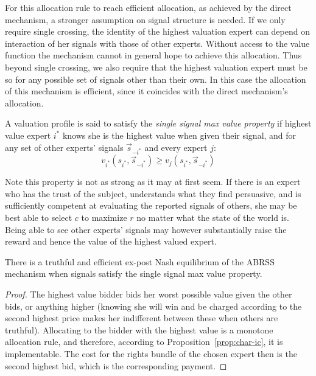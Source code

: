 For this allocation rule to reach efficient allocation, as achieved by the direct mechanism, a stronger assumption on signal structure is needed. If we only require single crossing, the identity of the highest valuation expert can depend on interaction of her signals with those of other experts. Without access to the value function the mechanism cannot in general hope to achieve this allocation.
Thus beyond single crossing, we also require that the highest valuation expert must be so for any possible set of signals other than their own. In this case the allocation of this mechanism is efficient, since it coincides with the direct mechanism's allocation.


\begin{defn}
	A valuation profile is said to satisfy the \emph{single signal max value property} if highest value expert $i^*$ knows she is the highest value when given their signal, and for any set of other experts' signals $\vec{s}_{-i^*}$ and every expert $j$: $$v_{i^*}(s_{i^*}, \vec{s}_{-i^*}) \geq  v_j(s_{i^*}, \vec{s}_{-i^*})$$
\end{defn}


Note this property is not as strong as it may at first seem. If there is an expert who has the trust of the subject, understands what they find persuasive, and is sufficiently competent at evaluating the reported signals of others, she may be best able to select $c$ to maximize $r$ no matter what the state of the world is. Being able to see other experts' signals may however substantially raise the reward and hence the value of the highest valued expert.  


\begin{thm}
	There is a truthful and efficient ex-post Nash equilibrium of the ABRSS mechanism when signals satisfy the single signal max value property.
\end{thm}

\begin{proof}
	The highest value bidder bids her worst possible value given the other bids, or anything higher (knowing she will win and be charged according to the second highest price makes her indifferent between these when others are truthful).
	Allocating to the bidder with the highest value is a monotone allocation rule, and therefore, according to Proposition~\ref{prop:char-ic}, it is implementable. The cost for the rights bundle of the chosen expert then is the second highest bid, which is the corresponding payment.
\end{proof}



